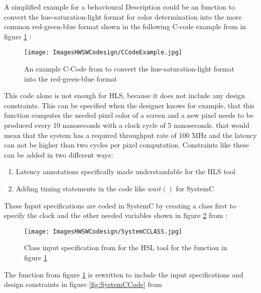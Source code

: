 \documentclass[conference]{IEEEtran}
\begin{document}
A simplified example for a behavioural Description could be an function to convert the hue-saturation-light format for color determination into the more common red-green-blue format shown in the following C-code example from \cite{ElectronicDesignAutomation} in figure \ref{fig:CcodeRGB} :

\begin{figure}[htbp]
    \centering
    \texttt{[image: ImagesHWSWCodesign/CCodeExample.jpg]}
    \caption{An example C-Code from \cite{ElectronicDesignAutomation} to convert the hue-saturation-light format into the red-green-blue format}
    \label{fig:CcodeRGB}
\end{figure}

This code alone is not enough for HLS, because it does not include any design constraints\cite{ElectronicDesignAutomation}. This can be specified when the designer knows for example, that this function computes the needed pixel color of a screen and a new pixel needs to be produced every 10 nanoseconds with a clock cycle of 5 nanoseconds\cite{ElectronicDesignAutomation}. that would mean that the system has a required throughput rate of 100 MHz and the latency can not be higher than two cycles per pixel computation\cite{ElectronicDesignAutomation}. Constraints like these can be added in two different ways:

\begin{enumerate}
    \item Latency annotations specifically made understandable for the HLS tool\cite{ElectronicDesignAutomation}
    \item Adding timing statements in the code like  $wait()$ for SystemC\cite{ElectronicDesignAutomation}
\end{enumerate}

These Input specifications are coded in SystemC by creating a class first to specify the clock and the other needed variables shown in figure \ref{fig:SystemCClass} from \cite{ElectronicDesignAutomation}:

\begin{figure}[htbp]
    \centering
    \texttt{[image: ImagesHWSWCodesign/SystemCCLASS.jpg]}
    \caption{Class input specification from \cite{ElectronicDesignAutomation} for the HSL tool for the function in figure \ref{fig:CcodeRGB}}
    \label{fig:SystemCClass}
\end{figure}

The function from figure \ref{fig:CcodeRGB} is rewritten to include the input specifications and design constraints in figure \ref{fig:SystemCCode} from \cite{ElectronicDesignAutomation}
\end{document}
